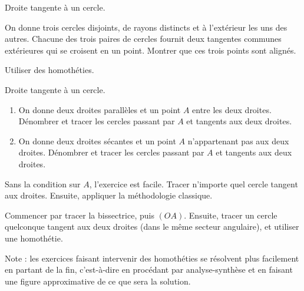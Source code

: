 \begin{exo}
\begin{prerequis}Droite tangente à un cercle.\end{prerequis}
On donne trois cercles disjoints, de rayons distincts et à l'extérieur les uns des autres. Chacune des trois paires de cercles fournit deux tangentes communes extérieures qui se croisent en un point.  Montrer que ces trois points sont alignés.

\begin{hint}   
Utiliser des homothéties.
\end{hint}

\end{exo} 
 
\begin{exo} %
\begin{prerequis}Droite tangente à un cercle.\end{prerequis}

\begin{enumerate}
\item On donne deux droites parallèles et un point $A$ entre les deux droites. Dénombrer et tracer les cercles passant par $A$ et tangents aux deux droites.
\item On donne deux droites sécantes et un point $A$ n'appartenant pas aux deux droites. Dénombrer et tracer les cercles passant par $A$ et tangents aux deux droites.

\end{enumerate}


\begin{hint}   
Sans la condition sur $A$, l'exercice est facile. Tracer n'importe quel cercle tangent aux droites. Ensuite, appliquer la méthodologie classique. %
\end{hint}
\begin{sol}
Commencer par tracer la bissectrice, puis $(OA)$. Ensuite, tracer un cercle quelconque tangent aux deux droites (dans le même secteur angulaire), et utiliser une homothétie. 

Note : les exercices faisant intervenir des homothéties se résolvent plus facilement en \og partant de la fin\fg, c'est-à-dire en procédant par analyse-synthèse et en faisant une figure approximative de ce que sera la solution.
\end{sol} 
\end{exo}  




